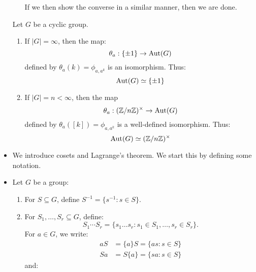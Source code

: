 \begin{itemize}
\begin{corollary}
\begin{enumerate}
            If we then show the converse in a similar manner, then we are done.
        \end{enumerate}
    \end{corollary}
    \begin{corollary}
        Let $G$ be a cyclic group.
        \begin{enumerate}
            \item If $|G|=\infty$, then the map:
            \begin{equation}
                \theta_a: \{\pm 1\} \rightarrow \operatorname{Aut}(G)
            \end{equation}
            defined by $\theta_a(k)=\phi_{a,a^k}$ is an isomorphism. Thus:
            \begin{equation}
                \operatorname{Aut}(G) \simeq \{\pm 1\}
            \end{equation}
            \item If $|G| = n<\infty$, then the map \begin{equation}
                \theta_a: (\mathbb{Z}/n\mathbb{Z})^\times \rightarrow \operatorname{Aut}(G)
            \end{equation}
            defined by $\theta_a([k])=\phi_{a,a^k}$ is a well-defined isomorphism. Thus:
            \begin{equation}
                \operatorname{Aut}(G) \simeq (\mathbb{Z}/n\mathbb{Z})^\times
            \end{equation}
        \end{enumerate}
    \end{corollary}
    \item We introduce cosets and Lagrange's theorem. We start this by defining some notation.
    \item Let $G$ be a group:
    \begin{enumerate}
        \item For $S \subseteq G$, define $S^{-1} = \{s^{-1}:s\in S\}$.
        \item For $S_1,\dots,S_r \subseteq G$, define:
        \begin{equation}
            S_1\cdots S_r = \{s_1\dots s_r:s_1\in S_1,\dots,s_r\in S_r\}.
        \end{equation}
        For $a \in G$, we write:
        \begin{align}
            aS &= \{a\}S = \{as:s\in S\} \\ 
            Sa &= S\{a\} = \{sa: s\in S\}
        \end{align}
        and:
        \begin{equation}

\end{equation}
\end{enumerate}
\end{itemize}
